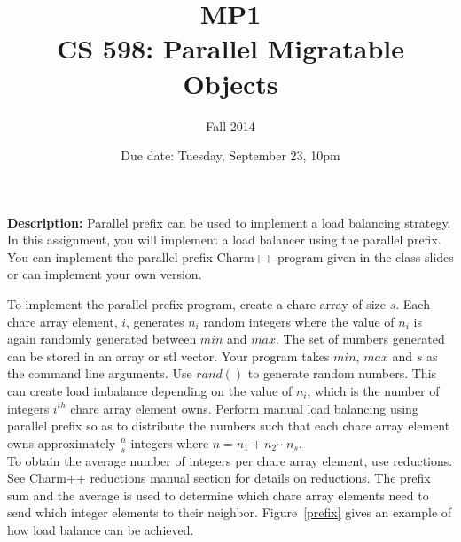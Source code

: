 \documentclass{article}
\title{MP1 \\ CS 598: Parallel Migratable Objects}
\author{Fall 2014}
\date{Due date: Tuesday, September 23, 10pm}
\begin{document}
\maketitle

\textbf{Description:} 
Parallel prefix can be used to implement a load balancing strategy. In this
assignment, you will implement a load balancer using the parallel prefix. You
can implement the parallel prefix Charm++ program given in the class slides or
can implement your own version. 


To implement the parallel prefix program, create a chare array of size $s$. Each
chare array element, $i$, generates $n_i$ random integers where the value of
$n_i$ is again randomly generated between $min$ and $max$. The set of numbers generated
can be stored in an array or stl vector. Your program takes $min$,
$max$ and $s$ as the command line arguments. Use $rand()$ to generate random
numbers. This can create load imbalance depending on the value of $n_i$, which is
the number of integers $i^{th}$ chare array element owns. Perform manual load
balancing using parallel prefix so as to distribute the numbers such that each
chare array element owns approximately  $\frac{n}{s}$ integers where  $n = n_1 +
n_2 \cdots n_s$.\\




To obtain the average number of integers per chare array element, use
reductions. See
\href{http://charm.cs.uiuc.edu/manuals/html/charm++/4.html#SECTION01361000000000000000}{Charm++
reductions manual section} for details on reductions. The prefix sum and the
average is used to determine which chare array elements need to send which
integer elements to their neighbor. Figure~\ref{prefix} gives an example of how
load balance can be achieved. 
\end{document}
